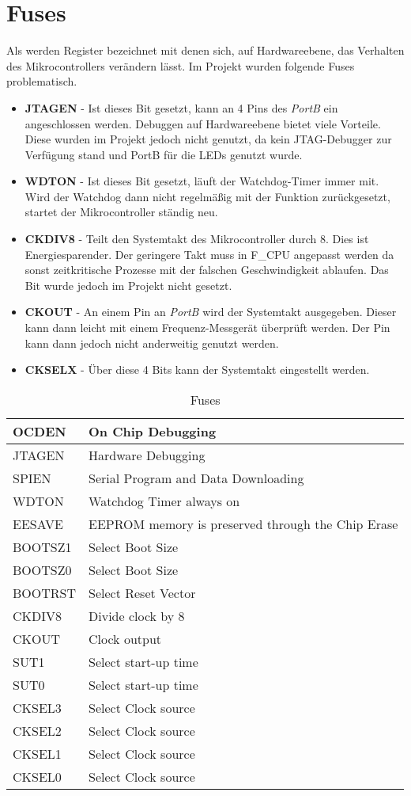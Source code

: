 \section{Fuses}
\label{sec:Fuses}
Als  werden Register bezeichnet mit denen sich, auf Hardwareebene, das Verhalten des Mikrocontrollers verändern lässt. Im Projekt wurden folgende Fuses problematisch.
\begin{itemize}
\item \textbf{JTAGEN} - Ist dieses Bit gesetzt, kann an 4 Pins des \emph{PortB} ein  angeschlossen werden. Debuggen auf Hardwareebene bietet viele Vorteile. Diese wurden im Projekt jedoch nicht genutzt, da kein JTAG-Debugger zur Verfügung stand und PortB für die LEDs genutzt wurde.
\item \textbf{WDTON} - Ist dieses Bit gesetzt, läuft der Watchdog-Timer immer mit. Wird der Watchdog dann nicht regelmäßig mit der Funktion  zurückgesetzt, startet der Mikrocontroller ständig neu. 
\item \textbf{CKDIV8} - Teilt den Systemtakt des Mikrocontroller durch 8. Dies ist Energiesparender. Der geringere Takt muss in F\_CPU angepasst werden da sonst zeitkritische Prozesse mit der falschen Geschwindigkeit ablaufen. Das Bit wurde jedoch im Projekt nicht gesetzt.
\item \textbf{CKOUT} - An einem Pin an \emph{PortB} wird der Systemtakt ausgegeben. Dieser kann dann leicht mit einem Frequenz-Messgerät überprüft werden. Der Pin kann dann jedoch nicht anderweitig genutzt werden.
\item \textbf{CKSELX} - Über diese 4 Bits kann der Systemtakt eingestellt werden.
\end{itemize}
\begin{longtable}{|l|l|} 
\caption{Fuses} \\
\hline
\label{tab:Fuses}
OCDEN & On Chip Debugging \\ \hline 
JTAGEN & Hardware Debugging \\ \hline 
SPIEN & Serial Program and Data Downloading \\ \hline 
WDTON & Watchdog Timer always on \\ \hline 
EESAVE & EEPROM memory is preserved through the Chip Erase \\ \hline 
BOOTSZ1 & Select Boot Size \\ \hline 
BOOTSZ0 & Select Boot Size \\ \hline 
BOOTRST & Select Reset Vector \\ \hline 
CKDIV8 & Divide clock by 8 \\ \hline 
CKOUT & Clock output \\ \hline 
SUT1 & Select start-up time \\ \hline 
SUT0 & Select start-up time \\ \hline 
CKSEL3 & Select Clock source \\ \hline 
CKSEL2 & Select Clock source \\ \hline 
CKSEL1 & Select Clock source \\ \hline 
CKSEL0 & Select Clock source \\ \hline 
\end{longtable} 
